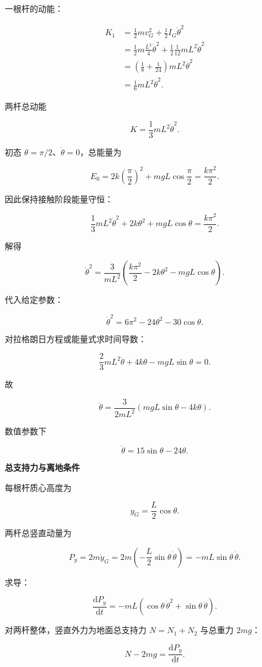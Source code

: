 \documentclass[12pt,a4paper,UTF8]{ctexart}
\begin{document}
一根杆的动能：

\[\begin{aligned}
K_1
&=\frac12mv_G^2+\frac12I_G\dot\theta^2\\
&=\frac12m\frac{L^2}{4}\dot\theta^2
+\frac12\frac1{12}mL^2\dot\theta^2\\
&=\left(\frac18+\frac1{24}\right)mL^2\dot\theta^2\\
&=\frac16mL^2\dot\theta^2.
\end{aligned}\]

两杆总动能

\[\boxed{K=\frac13mL^2\dot\theta^2}.\]

初态 \(\theta=\pi/2\)、\(\dot\theta=0\)，总能量为

\[E_0=2k\left(\frac\pi2\right)^2+mgL\cos\frac\pi2
=\frac{k\pi^2}{2}.\]

因此保持接触阶段能量守恒：

\[\frac13mL^2\dot\theta^2+2k\theta^2+mgL\cos\theta
=\frac{k\pi^2}{2}.\]

解得

\[\boxed{
\dot\theta^2=\frac{3}{mL^2}\left(
\frac{k\pi^2}{2}-2k\theta^2-mgL\cos\theta
\right)
}.\]

代入给定参数：

\[\boxed{
\dot\theta^2=6\pi^2-24\theta^2-30\cos\theta
}.\]

对拉格朗日方程或能量式求时间导数：

\[\frac23mL^2\ddot\theta+4k\theta-mgL\sin\theta=0.\]

故

\[\boxed{
\ddot\theta=\frac{3}{2mL^2}(mgL\sin\theta-4k\theta)
}.\]

数值参数下

\[\boxed{\ddot\theta=15\sin\theta-24\theta}.\]

\textbf{总支持力与离地条件}

每根杆质心高度为

\[y_G=\frac L2\cos\theta.\]

两杆总竖直动量为

\[P_y=2m\dot y_G
=2m\left(-\frac L2\sin\theta\,\dot\theta\right)
=-mL\sin\theta\,\dot\theta.\]

求导：

\[\frac{\mathrm{d}P_y}{\mathrm{d}t}
=-mL\left(\cos\theta\,\dot\theta^2+\sin\theta\,\ddot\theta\right).\]

对两杆整体，竖直外力为地面总支持力 \(N=N_1+N_2\) 与总重力 \(2mg\)：

\[N-2mg=\frac{\mathrm{d}P_y}{\mathrm{d}t}.\]
\end{document}
